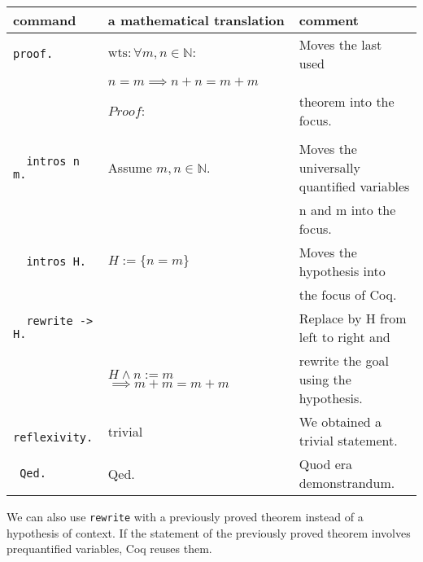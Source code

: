      \begin{tabular} {|l|l|l|}
     	\hline
     	  command                        & a mathematical translation          & comment \\  \hline
     	 \lstinline!proof.!              & $\text{wts}: \forall m,n \in \mathbb{N}:$ & Moves the last used \\   
     	      	                         &  $n = m \implies n+n = m+m \qquad$  &         \\     
     	      	                         &  $Proof:$                           & theorem into the focus.\\  
       	                                 &                                     &                                    \\   \hline
         \lstinline!  intros n m.!       & Assume $m,n \in \mathbb{N}.$        & Moves the universally quantified variables\\
                                         &                                     & n and m into the focus.   \\   \hline                                            
          \lstinline!  intros H.!        & $H :=\{n=m\}$                       & Moves the hypothesis into              \\ 
    	                                 &                                     & the focus of Coq.                                          \\    \hline   
     	 \lstinline!  rewrite -> H.!     &                                     & Replace by H from left to right and                            \\  
     	                                 & $H \wedge n:=m$ $\implies m+m = m+m$& rewrite the goal using the hypothesis.           \\ \hline
     	 \lstinline!  reflexivity.!      & trivial                             &  We obtained a trivial statement.                 \\ \hline
    	 \lstinline! Qed.!                & Qed.                                &  Quod era demonstrandum.                         \\  \hline
    	 
     \end{tabular}
   
   
   
   
   We can also use \lstinline!rewrite! with a previously proved theorem instead of a hypothesis of context.
   If the statement of the previously proved theorem involves prequantified variables, Coq reuses them.
   
